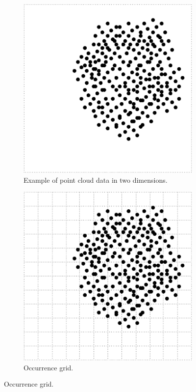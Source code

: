 \begin{figure}[ht]
    \centering
    
    \begin{subfigure}[t]{0.3\textwidth}
        \includegraphics[width=\textwidth]{point-cloud-plot.pdf}
        \caption{Example of point cloud data in two dimensions.}
    \end{subfigure}
    \begin{subfigure}[t]{0.3\textwidth}
        \includegraphics[width=\textwidth]{occurrence-grid.pdf}
        \caption{Occurrence grid.}
    \end{subfigure}
    

\end{figure}
